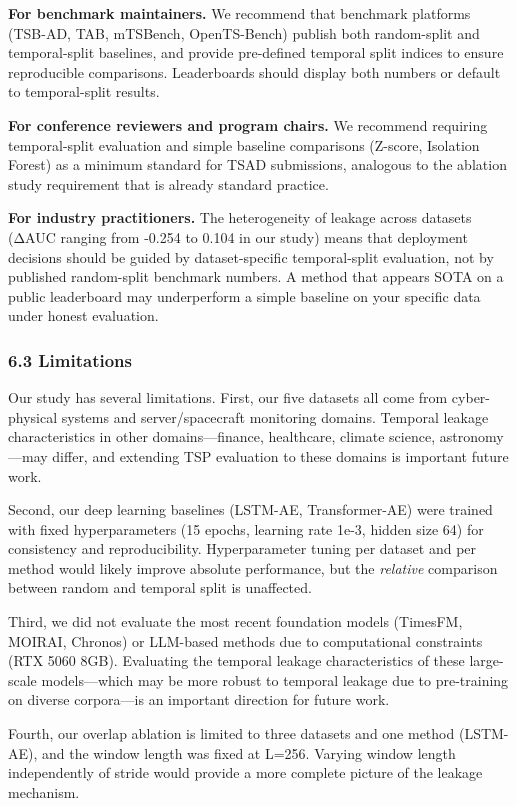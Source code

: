 \documentclass[
]{article}
\begin{document}
\textbf{For benchmark maintainers.} We recommend that benchmark
platforms (TSB-AD, TAB, mTSBench, OpenTS-Bench) publish both
random-split and temporal-split baselines, and provide pre-defined
temporal split indices to ensure reproducible comparisons. Leaderboards
should display both numbers or default to temporal-split results.

\textbf{For conference reviewers and program chairs.} We recommend
requiring temporal-split evaluation and simple baseline comparisons
(Z-score, Isolation Forest) as a minimum standard for TSAD submissions,
analogous to the ablation study requirement that is already standard
practice.

\textbf{For industry practitioners.} The heterogeneity of leakage across
datasets (ΔAUC ranging from -0.254 to 0.104 in our study) means that
deployment decisions should be guided by dataset-specific temporal-split
evaluation, not by published random-split benchmark numbers. A method
that appears SOTA on a public leaderboard may underperform a simple
baseline on your specific data under honest evaluation.

\subsubsection{6.3 Limitations}\label{limitations}

Our study has several limitations. First, our five datasets all come
from cyber-physical systems and server/spacecraft monitoring domains.
Temporal leakage characteristics in other domains---finance, healthcare,
climate science, astronomy---may differ, and extending TSP evaluation to
these domains is important future work.

Second, our deep learning baselines (LSTM-AE, Transformer-AE) were
trained with fixed hyperparameters (15 epochs, learning rate 1e-3,
hidden size 64) for consistency and reproducibility. Hyperparameter
tuning per dataset and per method would likely improve absolute
performance, but the \emph{relative} comparison between random and
temporal split is unaffected.

Third, we did not evaluate the most recent foundation models (TimesFM,
MOIRAI, Chronos) or LLM-based methods due to computational constraints
(RTX 5060 8GB). Evaluating the temporal leakage characteristics of these
large-scale models---which may be more robust to temporal leakage due to
pre-training on diverse corpora---is an important direction for future
work.

Fourth, our overlap ablation is limited to three datasets and one method
(LSTM-AE), and the window length was fixed at L=256. Varying window
length independently of stride would provide a more complete picture of
the leakage mechanism.
\end{document}
